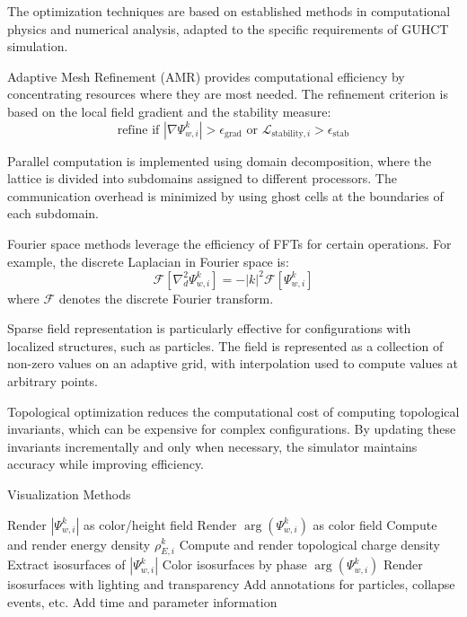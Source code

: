 \documentclass[11pt,a4paper]{article}
\makeatletter
\renewenvironment{proof}[1][\proofname]{\par
  \pushQED{\qed}%
  \normalfont \topsep6\p@\@plus6\p@\relax
  \trivlist
  \item[\hskip\labelsep
        \itshape
    #1\@addpunct{.}]\ignorespaces
}{%
  \popQED\endtrivlist\@endpefalse
}
\makeatother
\begin{document}
\begin{proof}
The optimization techniques are based on established methods in computational physics and numerical analysis, adapted to the specific requirements of GUHCT simulation.

Adaptive Mesh Refinement (AMR) provides computational efficiency by concentrating resources where they are most needed. The refinement criterion is based on the local field gradient and the stability measure:
\begin{equation}
\text{refine if } |\nabla\Psi_{w,i}^k| > \epsilon_{\text{grad}} \text{ or } \mathcal{L}_{\text{stability},i} > \epsilon_{\text{stab}}
\end{equation}

Parallel computation is implemented using domain decomposition, where the lattice is divided into subdomains assigned to different processors. The communication overhead is minimized by using ghost cells at the boundaries of each subdomain.

Fourier space methods leverage the efficiency of FFTs for certain operations. For example, the discrete Laplacian in Fourier space is:
\begin{equation}
\mathcal{F}[\nabla^2_d \Psi_{w,i}^k] = -|k|^2 \mathcal{F}[\Psi_{w,i}^k]
\end{equation}
where $\mathcal{F}$ denotes the discrete Fourier transform.

Sparse field representation is particularly effective for configurations with localized structures, such as particles. The field is represented as a collection of non-zero values on an adaptive grid, with interpolation used to compute values at arbitrary points.

Topological optimization reduces the computational cost of computing topological invariants, which can be expensive for complex configurations. By updating these invariants incrementally and only when necessary, the simulator maintains accuracy while improving efficiency.
\end{proof}

\begin{algorithm}
\caption{Visualization Methods}
\label{alg:visualization}
\begin{algorithmic}[1]
        \State Render $|\Psi_{w,i}^k|$ as color/height field
        \State Render $\arg(\Psi_{w,i}^k)$ as color field
        \State Compute and render energy density $\rho_{E,i}^k$
        \State Compute and render topological charge density
        \State Extract isosurfaces of $|\Psi_{w,i}^k|$
        \State Color isosurfaces by phase $\arg(\Psi_{w,i}^k)$
        \State Render isosurfaces with lighting and transparency
    \EndIf
    \State Add annotations for particles, collapse events, etc.
    \State Add time and parameter information
\EndProcedure
\end{algorithmic}
\end{algorithm}
\end{document}
